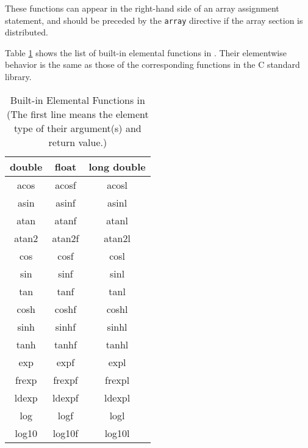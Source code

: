 These functions can appear in the right-hand side of an array
assignment statement, and should be preceded by the {\tt array}
directive if the array section is distributed.

Table \ref{tab:elemental_c} shows the list of built-in elemental
functions in {\XMPC}. Their elementwise behavior is the same as those of
the corresponding functions in the C standard library.

\begin{table}[h]
 \caption[Built-in Elemental Functions in {\XMPC}]{Built-in Elemental
 Functions in {\XMPC} (The first line means the element type of their
 argument(s) and return value.)}
 \label{tab:elemental_c}
 \begin{center}
 \begin{tabular}{c|c|c} \hline\hline
 double & float & long double \\ \hline
 acos & acosf & acosl \\
 asin & asinf & asinl \\
 atan & atanf & atanl \\
 atan2 & atan2f & atan2l \\
 cos & cosf & cosl \\
 sin & sinf & sinl \\
 tan & tanf & tanl \\

 cosh & coshf & coshl \\
 sinh & sinhf & sinhl \\
 tanh & tanhf & tanhl \\

 exp & expf & expl \\
 frexp & frexpf & frexpl \\
 ldexp & ldexpf & ldexpl \\
 log & logf & logl \\
 log10 & log10f & log10l \\


\end{tabular}
\end{center}
\end{table}
